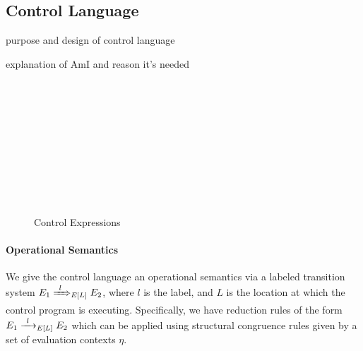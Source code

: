 \subsection{Control Language}
\label{sec:control-lang}

\todo purpose and design of control language

\todo explanation of AmI and reason it's needed

\begin{figure}
  \begin{syntax}
     \alternative{\CtrlFail}   \\
       \\
      \\
     \alternative{\RecvFrom{\ell}} \\
     \\
     \\
     \\
    \\
     \\

    \alternative{\CtrlFail}  

    \alternative{\CtrlNone}

    \abstractCategory[Systems]{\Pi}
  \end{syntax}

  \caption{Control Expressions}
  \label{fig:control-lang-syntax}
\end{figure}

\paragraph{Operational Semantics}
\label{sec:control-lang-semantics}
We give the control language an operational semantics via a labeled transition system $E_1 \ctrlstep[l] E_2$, where $l$ is the label, and $L$ is the location at which the control program is executing.
Specifically, we have reduction rules of the form $E_1 \ctrlreduce[l] E_2$ which can be applied using structural congruence rules given by a set of evaluation contexts $\eta$.

